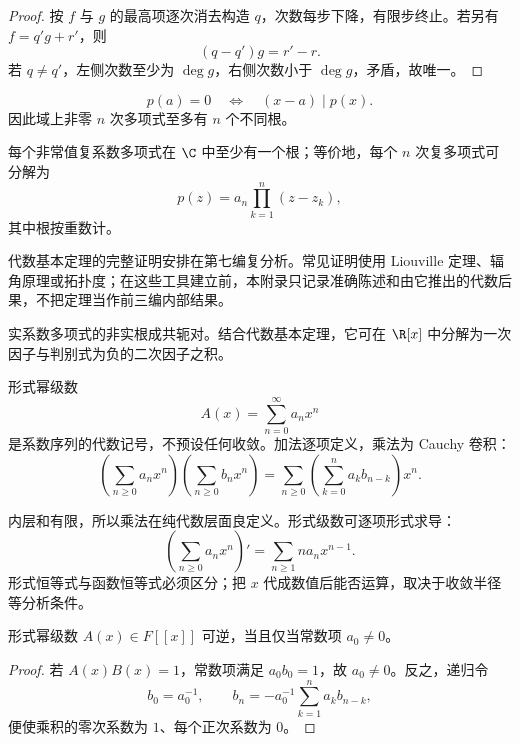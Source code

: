\begin{proof}
按 \(f\) 与 \(g\) 的最高项逐次消去构造 \(q\)，次数每步下降，有限步终止。若另有 \(f=q'g+r'\)，则
\[
 (q-q')g=r'-r.
\]
若 \(q\ne q'\)，左侧次数至少为 \(\deg g\)，右侧次数小于 \(\deg g\)，矛盾，故唯一。
\end{proof}

\begin{corollary}[因式定理]
\[
 p(a)=0\quad\Longleftrightarrow\quad(x-a)\mid p(x).
\]
因此域上非零 \(n\) 次多项式至多有 \(n\) 个不同根。
\end{corollary}

\begin{theorem}[代数基本定理]
每个非常值复系数多项式在 \(\C\) 中至少有一个根；等价地，每个 \(n\) 次复多项式可分解为
\[
 p(z)=a_n\prod_{k=1}^{n}(z-z_k),
\]
其中根按重数计。
\end{theorem}

\begin{remark}[证明依赖]
代数基本定理的完整证明安排在第七编复分析。常见证明使用 Liouville 定理、辐角原理或拓扑度；在这些工具建立前，本附录只记录准确陈述和由它推出的代数后果，不把定理当作前三编内部结果。
\end{remark}

实系数多项式的非实根成共轭对。结合代数基本定理，它可在 \(\R[x]\) 中分解为一次因子与判别式为负的二次因子之积。

\begin{definition}[形式幂级数]
形式幂级数
\[
 A(x)=\sum_{n=0}^{\infty}a_nx^n
\]
是系数序列的代数记号，不预设任何收敛。加法逐项定义，乘法为 Cauchy 卷积：
\[
 \left(\sum_{n\ge0}a_nx^n\right)
 \left(\sum_{n\ge0}b_nx^n\right)
 =
 \sum_{n\ge0}\left(\sum_{k=0}^na_kb_{n-k}\right)x^n.
\]
\end{definition}

内层和有限，所以乘法在纯代数层面良定义。形式级数可逐项形式求导：
\[
 \left(\sum_{n\ge0}a_nx^n\right)'
 =\sum_{n\ge1}na_nx^{n-1}.
\]
形式恒等式与函数恒等式必须区分；把 \(x\) 代成数值后能否运算，取决于收敛半径等分析条件。

\begin{proposition}
形式幂级数 \(A(x)\in F[[x]]\) 可逆，当且仅当常数项 \(a_0\ne0\)。
\end{proposition}

\begin{proof}
若 \(A(x)B(x)=1\)，常数项满足 \(a_0b_0=1\)，故 \(a_0\ne0\)。反之，递归令
\[
 b_0=a_0^{-1},\qquad
 b_n=-a_0^{-1}\sum_{k=1}^na_kb_{n-k},
\]
便使乘积的零次系数为 \(1\)、每个正次系数为 \(0\)。
\end{proof}

